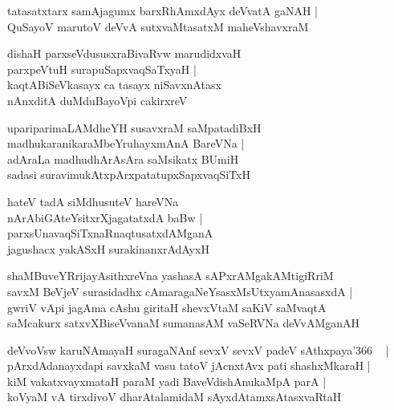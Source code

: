 \documentclass[twoside,12pt,openright]{book}
\newcounter{shloka}[chapter]
\begin{document}
\begin{shloka}%
tatasatxtarx samAjagumx barxRhAmxdAyx deVvatA gaNAH |\\
QuSayoV marutoV deVvA sutxvaMtasatxM maheVshavxraM 
\end{shloka}

\begin{shloka}%
dishaH parxseVdususxraBivaRvw marudidxvaH \\
parxpeVtuH surapuSapxvaqSaTxyaH |\\
kaqtABiSeVkasayx ca tasayx niSavxnAtasx \\
nAnxditA duMduBayoVpi cakirxreV 
\end{shloka}

\begin{shloka}%
upariparimaLAMdheYH susavxraM saMpatadiBxH \\
madhukaranikaraMbeYruhayxmAnA BareVNa |\\
adAraLa madhudhArAsAra saMsikatx BUmiH \\
sadasi suravimukAtxpArxpatatupxSapxvaqSiTxH
\end{shloka}

\begin{shloka}%
hateV tadA siMdhusuteV hareVNa \\
nArAbiGAteYsitxrXjagatatxdA baBw |\\
parxsUnavaqSiTxnaRnaqtusatxdAMganA \\
jagushacx yakASxH surakinanxrAdAyxH
\end{shloka}

\begin{shloka}%
shaMBuveYRrijayAsithxreVna yashasA sAPxrAMgakAMtigiRriM \\
savxM BeVjeV surasidadhx cAmaragaNeYsasxMsUtxyamAnasasxdA |\\
gwriV vApi jagAma cAshu giritaH shevxVtaM saKiV saMvaqtA \\
saMcakurx satxvXBiseVvanaM sumanasAM vaSeRVNa deVvAMganAH 
\end{shloka}

\begin{shloka}%
deVvoVsw karuNAmayaH suragaNAnf sevxV sevxV padeV sAthxpaya\char'366 ~ |\\
pArxdAdanayxdapi savxkaM vasu tatoV jAcnxtAvx pati shashxMkaraH |\\
kiM vakatxvayxmataH paraM yadi BaveVdishAnukaMpA parA |\\
koVyaM vA tirxdivoV dharAtalamidaM sAyxdAtamxsAtasxvaRtaH
\end{shloka}
\end{document}
